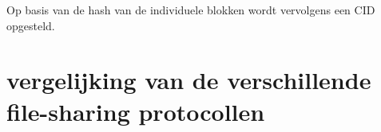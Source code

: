 Op basis van de hash van de individuele blokken wordt vervolgens een CID opgesteld.  

\section{vergelijking van de verschillende file-sharing protocollen}
\label{vergelijking-FS}
